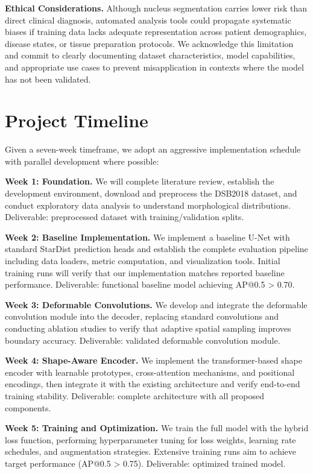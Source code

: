 \documentclass[acmlarge]{acmart}
\begin{document}
\textbf{Ethical Considerations.} Although nucleus segmentation carries lower risk than direct clinical diagnosis, automated analysis tools could propagate systematic biases if training data lacks adequate representation across patient demographics, disease states, or tissue preparation protocols. We acknowledge this limitation and commit to clearly documenting dataset characteristics, model capabilities, and appropriate use cases to prevent misapplication in contexts where the model has not been validated.

\section{Project Timeline}

Given a seven-week timeframe, we adopt an aggressive implementation schedule with parallel development where possible:

\textbf{Week 1: Foundation.} We will complete literature review, establish the development environment, download and preprocess the DSB2018 dataset, and conduct exploratory data analysis to understand morphological distributions. Deliverable: preprocessed dataset with training/validation splits.

\textbf{Week 2: Baseline Implementation.} We implement a baseline U-Net with standard StarDist prediction heads and establish the complete evaluation pipeline including data loaders, metric computation, and visualization tools. Initial training runs will verify that our implementation matches reported baseline performance. Deliverable: functional baseline model achieving AP@0.5 > 0.70.

\textbf{Week 3: Deformable Convolutions.} We develop and integrate the deformable convolution module into the decoder, replacing standard convolutions and conducting ablation studies to verify that adaptive spatial sampling improves boundary accuracy. Deliverable: validated deformable convolution module.

\textbf{Week 4: Shape-Aware Encoder.} We implement the transformer-based shape encoder with learnable prototypes, cross-attention mechanisms, and positional encodings, then integrate it with the existing architecture and verify end-to-end training stability. Deliverable: complete architecture with all proposed components.

\textbf{Week 5: Training and Optimization.} We train the full model with the hybrid loss function, performing hyperparameter tuning for loss weights, learning rate schedules, and augmentation strategies. Extensive training runs aim to achieve target performance (AP@0.5 > 0.75). Deliverable: optimized trained model.
\end{document}
